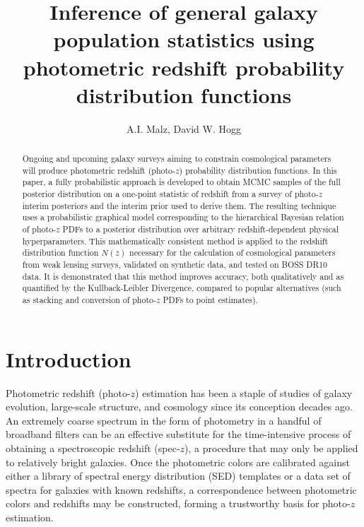 \documentclass[preprint]{aastex}
\begin{document}
\title{Inference of general galaxy population statistics using photometric 
redshift probability distribution functions}

\author{A.I. Malz, David W. Hogg}


\begin{abstract}
Ongoing and upcoming galaxy surveys aiming to constrain cosmological parameters 
will produce photometric redshift (photo-$z$) probability distribution 
functions.  In this paper, a fully probabilistic approach is developed to 
obtain MCMC samples of the full posterior distribution on a one-point statistic 
of redshift from a survey of photo-$z$ interim posteriors and the interim prior 
used to derive them.  The resulting technique uses a probabilistic graphical 
model corresponding to the hierarchical Bayesian relation of photo-$z$ PDFs to 
a posterior distribution over arbitrary redshift-dependent physical 
hyperparameters.  This mathematically consistent method is applied to the 
redshift distribution function $N(z)$ necessary for the calculation of 
cosmological parameters from weak lensing surveys, validated on synthetic data, 
and tested on BOSS DR10 data.  It is demonstrated that this method improves 
accuracy, both qualitatively and as quantified by the Kullback-Leibler 
Divergence, compared to popular alternatives (such as stacking and conversion 
of photo-$z$ PDFs to point estimates).
\end{abstract}


\clearpage
\section{Introduction}
\label{sec:intro}

Photometric redshift (photo-$z$) estimation has been a staple of studies of 
galaxy evolution, large-scale structure, and cosmology since its conception 
decades ago\citep{Baum1962}.  An extremely coarse spectrum in the form of 
photometry in a handful of broadband filters can be an effective substitute for 
the time-intensive process of obtaining a spectroscopic redshift (spec-$z$), a 
procedure that may only be applied to relatively bright galaxies.  Once the 
photometric colors are calibrated against either a library of spectral energy 
distribution (SED) templates or a data set of spectra for galaxies with known 
redshifts, a correspondence between photometric colors and redshifts may be 
constructed, forming a trustworthy basis for photo-$z$ estimation.  
\end{document}
